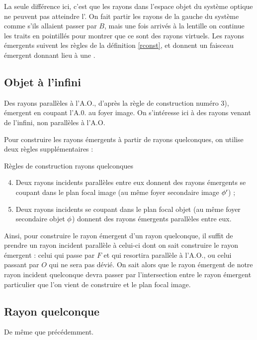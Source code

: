 \documentclass[10pt,a5paper,notitlepage]{book}
\begin{document}
La seule différence ici, c'est que les rayons dans l'espace objet du
système optique ne peuvent pas atteindre l'. On fait partir les rayons de
la gauche du système comme s'ils allaient passer par $B$, mais une fois arrivés
à la lentille on continue les traits en pointillés pour montrer que ce sont des
rayons virtuels. Les rayons émergents suivent les règles de la définition
\ref{rconst}, et donnent un faisceau émergent  donnant lieu à une
.

\subsection{Objet à l'infini}
Des rayons parallèles à l'A.O., d'après la règle de construction
numéro \textcolor{brandeisblue}{3)}, émergent en coupant l'A.0. au foyer image.
On s'intéresse ici à des rayons venant de l'infini, non parallèles à l'A.O.
\bigbreak

Pour construire les rayons émergents à partir de rayons quelconques, on utilise
deux règles supplémentaires :

\begin{defi}[label = rconstp]{Règles de construction rayons quelconques}
    \begin{enumerate}
        \setcounter{enumi}{3}
        \item Deux rayons incidents parallèles entre eux donnent des rayons
            émergents se coupant dans le plan focal image (au même foyer
            secondaire image $\phi'$) ;
        \item Deux rayons incidents se coupant dans le plan focal objet (au même
            foyer secondaire objet $\phi$) donnent des rayons émergents
            parallèles entre eux.
    \end{enumerate}
\end{defi}

Ainsi, pour construire le rayon émergent d'un rayon quelconque, il suffit de
prendre un rayon incident parallèle à celui-ci dont on sait construire le rayon
émergent : celui qui passe par $F$ et qui resortira parallèle à l'A.O., ou celui
passant par $O$ qui ne sera pas dévié. On sait alors que le rayon émergent de
notre rayon incident quelconque devra passer par l'intersection entre le rayon
émergent particulier que l'on vient de construire et le plan focal image.

\subsection{Rayon quelconque}
De même que précédemment.
\end{document}
